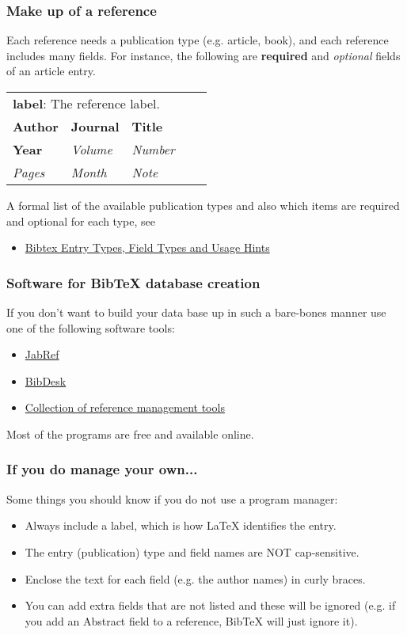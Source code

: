 \begin{frame}  \frametitle{Make up of a reference}
	Each reference needs a publication type (e.g. article, book), and each reference includes many fields. For instance, the following are \textbf{required} and \textit{optional} fields of an article entry.
	\begin{center}
		\begin{tabular}{lllrr}
			\multicolumn{5}{l}{\textbf{label}: The reference label.} \\
			\textbf{Author} & \textbf{Journal} & \textbf{Title} & \hspace{5mm} & \\
			\textbf{Year} & \textit{Volume} & \textit{Number} \\
			\textit{Pages} & \textit{Month} & \textit{Note}
		\end{tabular}
	\end{center}
	A formal list of the available publication types and also which items are required and optional for each type, see
	\begin{itemize}
		\item \href{http://www.openoffice.org/bibliographic/bibtex-defs.pdf}{Bibtex Entry Types, Field Types and Usage Hints}
	\end{itemize}
\end{frame}

\begin{frame}  \frametitle{Software for BibTeX database creation}
	If you don't want to build your data base up in such a bare-bones manner use one of the following software tools:
	\begin{itemize}
		\item \href{http://jabref.sourceforge.net/}{JabRef}
		\item \href{http://bibdesk.sourceforge.net/}{BibDesk}
		\item \href{https://en.wikipedia.org/wiki/Comparison\_of\_reference\_management\_software}{Collection of reference management tools}
	\end{itemize}
	Most of the programs are free and available online.
\end{frame}

\begin{frame}  \frametitle{If you do manage your own...}
	Some things you should know if you do not use a program manager:
	\begin{itemize}
		\item Always include a label, which is how LaTeX identifies the entry.
		\item The entry (publication) type and field names are NOT cap-sensitive.
		\item Enclose the text for each field (e.g. the author names) in curly braces.
		\item You can add extra fields that are not listed and these will be ignored (e.g. if you add an Abstract field to a reference, BibTeX will just ignore it).
	\end{itemize}
\end{frame}

